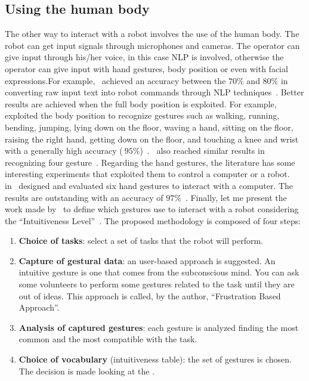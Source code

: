 \documentclass[../thesis.tex]{subfiles}
\begin{document}
\subsection{Using the human body}
The other way to interact with a robot involves the use of the human body. The robot can get input signals through microphones and cameras. The operator can give input through his/her voice, in this case \acrfull{NLP} is involved, otherwise the operator can give input with hand gestures, body position or even with facial expressions.For example,~\citeauthor{article:commanding_a_robot_with_NLP} achieved an accuracy between the $70\%$ and $80\%$ in converting raw input text into robot commands through \acrshort{NLP} techniques~\cite{article:commanding_a_robot_with_NLP}. Better results are achieved when the full body position is exploited. For example, \citeauthor{article:example_full_body_gesture1} exploited the body position to recognize gestures such as walking, running, bending, jumping, lying down on the floor, waving a hand, sitting on the floor, raising the right hand, getting down on the floor, and touching a knee and wrist with a generally high accuracy ($~95\%$)~\cite{article:example_full_body_gesture1}.~\citeauthor{article:example_full_body_gesture2} also reached similar results in~\citeyear{article:example_full_body_gesture2} recognizing four gesture~\cite{article:example_full_body_gesture2}. Regarding the hand gestures, the literature has some interesting experiments that exploited them to control a computer or a robot.~\citeauthor{article:design_and_evaluate_hand_gesture} in~\citeyear{article:design_and_evaluate_hand_gesture} designed and evaluated six hand gestures to interact with a computer. The results are outstanding with an accuracy of $97\%$~\cite{article:design_and_evaluate_hand_gesture}. Finally, let me present the work made by~\citeauthor{article:intuitiveness_level} to define which gestures use to interact with a robot considering the ``Intuitiveness Level''~\cite{article:intuitiveness_level}. The proposed methodology is composed of four steps:
\begin{enumerate}
    \item \textbf{Choice of tasks}: select a set of tasks that the robot will perform.
    \item \textbf{Capture of gestural data}: an user-based approach is suggested. An intuitive gesture is one that comes from the subconscious mind. You can ask some volunteers to perform some gestures related to the task until they are out of ideas. This approach is called, by the author, ``Frustration Based Approach''.
    \item \textbf{Analysis of captured gestures}: each gesture is analyzed finding the most common and the most compatible with the task.
    \item \textbf{Choice of vocabulary} (intuitiveness table): the set of gestures is chosen. The decision is made looking at the .
\end{enumerate}
\end{document}

